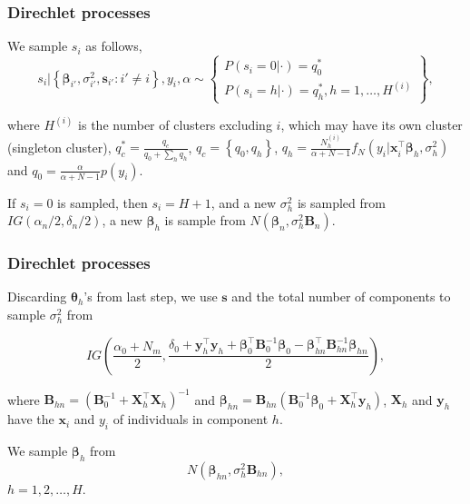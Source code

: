 \documentclass[12pt, compress]{beamer}
\begin{document}
\begin{frame}
	\frametitle{Direchlet processes}
We sample $s_i$ as follows,
\begin{equation*}
	s_i|\left\{\boldsymbol\beta_{i'},\sigma_{i'}^2,\boldsymbol s_{i'}:i'\neq i\right\}, y_i, \alpha\sim\begin{Bmatrix}P(s_i=0|\cdot)=q_0^*\\
		P(s_i=h|\cdot)=q_h^*, h=1,\dots,H^{(i)}\end{Bmatrix},
\end{equation*}

where $H^{(i)}$ is the number of clusters excluding $i$, which may have its own cluster (singleton cluster), $q^*_c=\frac{q_c}{q_0+\sum_h q_h}$, $q_c=\left\{q_0,q_h\right\}$, $q_h=\frac{N_h^{(i)}}{\alpha+N-1}f_N(y_i|\boldsymbol{x}_i^{\top}\boldsymbol\beta_h,\sigma_h^2)$ and $q_0=\frac{\alpha}{\alpha+N-1}p(y_i)$.

If $s_i=0$ is sampled, then $s_i=H+1$, and a new $\sigma_h^2$ is sampled from $IG\left(\alpha_n/2,\delta_n/2\right)$, a new $\boldsymbol\beta_h$ is sample from $N(\boldsymbol\beta_n,\sigma_h^2\boldsymbol B_n)$.

\end{frame}

\begin{frame}
	\frametitle{Direchlet processes}
Discarding $\boldsymbol\theta_h$'s from last step, we use $\boldsymbol s$ and the total number of components to sample $\sigma_h^2$ from 

\begin{equation*}
	IG\left(\frac{\alpha_0+N_m}{2},\frac{\delta_0+\boldsymbol y_h^{\top}\boldsymbol y_h+\boldsymbol{\beta}_0^{\top}{\boldsymbol{B}}_0^{-1}\boldsymbol{\beta}_0-\boldsymbol{\beta}_{hn}^{\top}{\boldsymbol{B}}_{hn}^{-1}\boldsymbol{\beta}_{hn}}{2}\right),
\end{equation*}

where $\boldsymbol{B}_{hn}=(\boldsymbol{B}_0^{-1}+\boldsymbol{X}_h^{\top}\boldsymbol{X}_h)^{-1}$ and $\boldsymbol{\beta}_{hn}=\boldsymbol{B}_{hn}(\boldsymbol{B}_0^{-1}\boldsymbol{\beta}_0+\boldsymbol{X}_h^{\top}\boldsymbol{y}_h)$, $\boldsymbol{X}_h$ and $\boldsymbol{y}_h$ have the $\boldsymbol{x}_i$ and $y_i$ of individuals in component $h$.

We sample $\boldsymbol\beta_h$ from
\begin{equation*}
	N\left({\boldsymbol\beta}_{hn},\sigma_h^2\boldsymbol B_{hn}\right),
\end{equation*}
$h=1,2,\dots,H$.
\end{frame}
\end{document}
